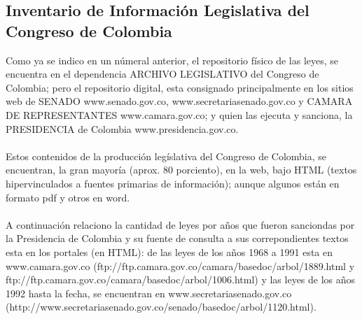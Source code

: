 \documentclass[conference]{IEEEtran}
\begin{document}
 \subsection{Inventario de Información Legislativa del Congreso de Colombia}   
	
	Como ya se indico en un númeral anterior, el repositorio físico de las leyes, se encuentra en el dependencia ARCHIVO LEGISLATIVO del Congreso de Colombia; pero el repositorio digital, esta consignado principalmente en los sitios web de SENADO www.senado.gov.co, www.secretariasenado.gov.co y CAMARA DE REPRESENTANTES www.camara.gov.co; y quien las ejecuta y sanciona, la PRESIDENCIA de Colombia www.presidencia.gov.co.  \\ \\
	Estos contenidos de la producción legíslativa del Congreso de Colombia, se encuentran, la gran mayoría (aprox. 80 porciento), en la web, bajo HTML (textos hipervinculados a fuentes primarias de información); aunque algunos están en formato pdf y otros en word.\\ \\
	A continuación relaciono la cantidad de leyes por años que fueron sanciondas por la Presidencia de Colombia y su fuente de consulta a sus correpondientes textos esta en los portales (en HTML): de las leyes de los años 1968 a 1991 esta en www.camara.gov.co (ftp://ftp.camara.gov.co/camara/basedoc/arbol/1889.html y ftp://ftp.camara.gov.co/camara/basedoc/arbol/1006.html) y las leyes de los años 1992 hasta la fecha, se encuentran en www.secretariasenado.gov.co (http://www.secretariasenado.gov.co/senado/basedoc/arbol/1120.html). \\
\end{document}
